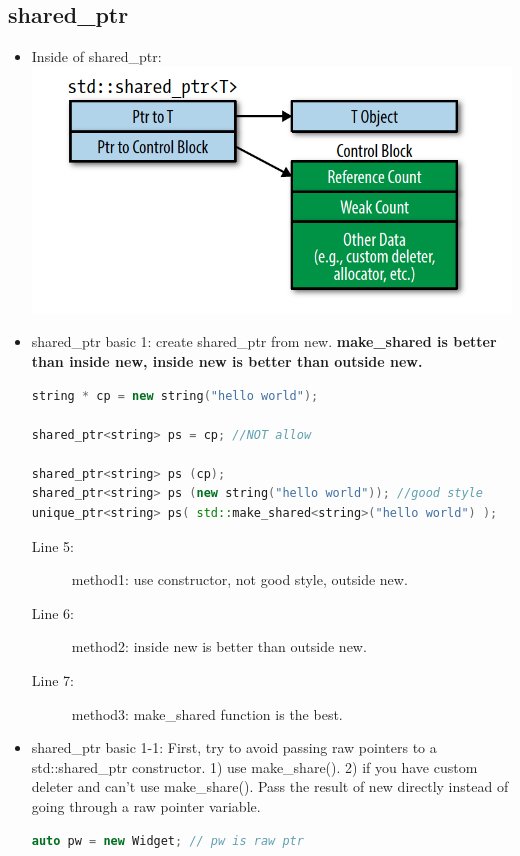 \documentclass[a4paper,11pt,twoside]{book}
\begin{document}
\subsection{shared\_ptr}
\begin{itemize}
\item Inside of shared\_ptr: \newline
\includegraphics[scale=0.6]{pics/shared.png}
	
\item shared\_ptr basic 1: create shared\_ptr from new. \textbf{make\_shared is better than inside new, inside new is better than outside new.}
\begin{lstlisting}[frame=single, language=c++]
string * cp = new string("hello world");

shared_ptr<string> ps = cp; //NOT allow

shared_ptr<string> ps (cp); 
shared_ptr<string> ps (new string("hello world")); //good style
unique_ptr<string> ps( std::make_shared<string>("hello world") );
\end{lstlisting}
\begin{description}
	\item[Line 5:] method1: use constructor, not good style, outside new.
	\item[Line 6:] method2: inside new is better than outside new.
	\item[Line 7:] method3: make\_shared function is the best.
\end{description}

\item shared\_ptr basic 1-1: First, try to avoid passing raw pointers to a std::shared\_ptr constructor. 1) use make\_share(). 2) if you have custom deleter and can't use make\_share().  Pass the result of new directly instead of going through a raw pointer variable.

\begin{lstlisting}[frame=single, language=c++]
auto pw = new Widget; // pw is raw ptr


\end{lstlisting}
\end{itemize}
\end{document}
